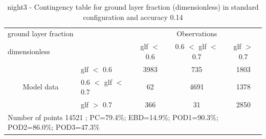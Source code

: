 \begin{table}[p!]
\begin{center}
\begin{tabular}{llccc}
\hline
{ground layer fraction}                                       &                                                    & \multicolumn{3}{c}{Observations}                 \\
{dimensionless}                                       &                             & glf $<$ 0.6   & 0.6 $<$ glf $<$ 0.7 & glf $>$ 0.7 \\
\hline
\multicolumn{1}{c}{\multirow{3}{*}{Model data}}  & glf $<$ 0.6             & 3983                & 735                       & 1803              \\
                                                 & 0.6  $<$ glf $<$ 0.7 & 62                & 4691                       & 1378              \\
                                                 & glf $>$ 0.7             & 366                & 31                       & 2850              \\
\hline
\multicolumn{5}{l}{ Number of points        14521 ; PC=79.4\%; EBD=14.9\%; POD1=90.3\%; POD2=86.0\%; POD3=47.3\%}
\end{tabular}
\end{center}
\caption{night3 - Contingency table for  ground layer fraction (dimensionless) in standard configuration and accuracy 0.14}
\label{tab:contingencyglfBEF:night3}
\end{table}

